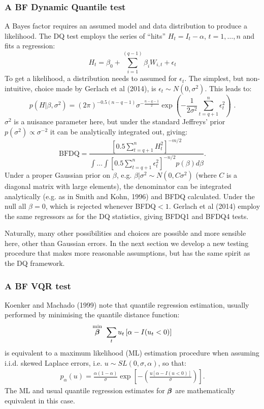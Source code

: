 \documentclass[12pt,epsf]{article}
\newcommand{\utwi}[1]{\mbox{\boldmath $ #1$}}
\begin{document}
\subsubsection{A BF Dynamic Quantile test}
A Bayes factor requires an assumed model and data distribution to produce a likelihood. The DQ test employs the series of ``hits'' $H_t =
I_{t}-\alpha$, $t=1,\ldots,n$ and fits a regression:
$$ H_t = \beta_0 + \sum_{i=1}^{(q-1)} \beta_i W_{i,t} + \epsilon_t$$
To get a likelihood, a distribution needs to assumed for $\epsilon_t$. The simplest, but non-intuitive, choice made by Gerlach et al (2014),
is $\epsilon_t \sim N(0,\sigma^2)$. This leads to:
$$p(H|\beta,\sigma^2) = (2 \pi)^{-0.5(n-q-1)} \sigma^{-\frac{n-q-1}{2}} \exp\left( -\frac{1}{2\sigma^2} \sum_{t=q+1}^n \epsilon_t^2\right) \,\, .$$
$\sigma^2$ is a nuisance parameter here, but under the standard Jeffreys' prior $p(\sigma^2) \propto \sigma^{-2}$ it can be
analytically integrated out, giving:
$$
\mbox{BFDQ} = \frac{ \left[ 0.5 \sum_{t=q+1}^n H_t^2\right]^{-m/2} }{\int \ldots \int \left[ 0.5 \sum_{t=q+1}^n \epsilon_t^2\right]^{-n/2}
p(\beta)  d \beta}.
$$
Under a proper Gaussian prior on $\beta$, e.g. $\beta|\sigma^2 \sim N(0,C \sigma^2)$ (where $C$ is a diagonal matrix with large elements),
the denominator can be integrated analytically (e.g. as in Smith and Kohn, 1996) and BFDQ calculated. Under the null all
$\beta = 0$, which is rejected whenever BFDQ$<1$. Gerlach et al (2014) employ the same regressors as for the DQ statistics,
giving BFDQ1 and BFDQ4 tests.

Naturally, many other possibilities and choices are possible and more sensible here, other than Gaussian errors. In the next
section we develop a new testing procedure that makes more reasonable assumptions, but has the same spirit as the DQ framework.

\subsubsection{A BF VQR test}
Koenker and Machado (1999) note that quantile regression estimation, usually performed by minimising the quantile distance function:
\begin{eqnarray*}
\stackrel{\rm min}{\utwi{\beta}} \,\, \sum_{t} u_{t} \left[\alpha-I(u_{t}<0)\right]
\end{eqnarray*}
is equivalent to a maximum likelihood (ML) estimation procedure when assuming i.i.d. skewed Laplace errors,
i.e. $u \sim SL(0,\sigma,\alpha)$, so that:
\begin{eqnarray*}
p_{\alpha}(u)=\frac{\alpha(1-\alpha)}{\sigma}\exp\left[-\left (\frac{u\left[\alpha-I(u<0)\right]}{\sigma}\right)\right].
\end{eqnarray*}
The ML and usual quantile regression estimates for $\utwi{\beta}$ are mathematically equivalent in this case.
\end{document}
